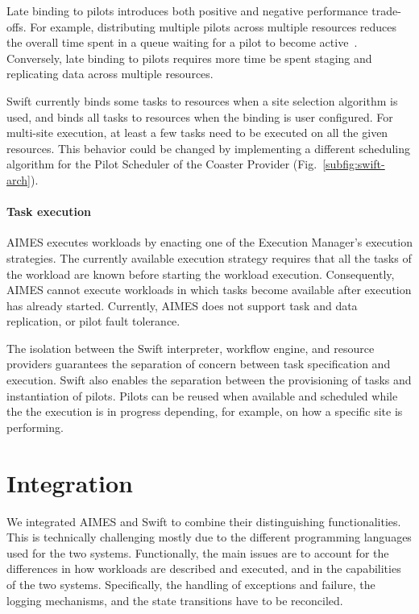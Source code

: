 \documentclass[10pt, conference, compsocconf]{IEEEtran}
\begin{document}
Late binding to pilots introduces both positive and negative performance
trade-offs. For example, distributing multiple pilots across multiple
resources reduces the overall time spent in a queue waiting for a pilot to
become active~\cite{turilli2016integrating}. Conversely, late binding to
pilots requires more time be spent staging and replicating data across
multiple resources.

Swift currently binds some tasks to resources when a site selection algorithm
is used, and binds all tasks to resources when the binding is user
configured. For multi-site execution, at least a few tasks need to be
executed on all the given resources. This behavior could be changed by
implementing a different scheduling algorithm for the Pilot Scheduler of the
Coaster Provider (Fig.~\ref{subfig:swift-arch}).

\paragraph{Task execution} AIMES executes workloads by enacting one of the
Execution Manager's execution strategies. The currently available execution
strategy requires that all the tasks of the workload are known before
starting the workload execution. Consequently, AIMES cannot execute workloads
in which tasks become available after execution has already started.
Currently, AIMES does not support task and data replication, or pilot fault
tolerance.

The isolation between the Swift interpreter, workflow engine, and resource
providers guarantees the separation of concern between task specification and
execution. Swift also enables the separation between the provisioning of
tasks and instantiation of pilots. Pilots can be reused when available and
scheduled while the the execution is in progress depending, for example, on
how a specific site is performing.


\section{Integration}\label{sec:integration}

We integrated AIMES and Swift to combine their distinguishing
functionalities. This is technically challenging mostly due to the different
programming languages used for the two systems. Functionally, the main issues
are to account for the differences in how workloads are described and
executed, and in the capabilities of the two systems. Specifically, the
handling of exceptions and failure, the logging mechanisms, and the state
transitions have to be reconciled.
\end{document}
